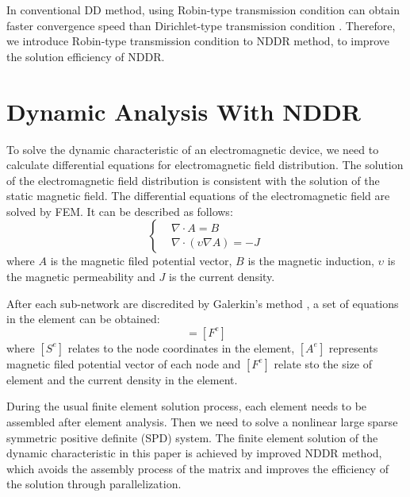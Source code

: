 \documentclass[journal,transmag]{IEEEtran}
\begin{document}
In conventional DD method, using Robin-type transmission condition  can obtain faster convergence speed than Dirichlet-type transmission condition \cite{IEEEhowto:Douglas}. Therefore, we introduce Robin-type transmission condition to NDDR method, to improve the solution efficiency of NDDR.
\section{Dynamic Analysis With NDDR}
To solve the dynamic characteristic of an electromagnetic device, we need to calculate differential equations for electromagnetic field distribution. The solution of the electromagnetic field distribution is consistent with the solution of the static magnetic field. The differential equations of the electromagnetic field are solved by FEM. It can be described as follows:
\begin{equation}
\left\{
\begin{aligned}
&{\nabla\cdot}A=B\\
&\nabla\cdot({\upsilon\nabla}A)=-J
\end{aligned}
\right.
\end{equation}
where $A$ is the magnetic filed potential vector, $B$ is the magnetic induction, $\upsilon$ is the magnetic permeability and $J$ is the current density. 

After each sub-network are discredited by Galerkin's method \cite{IEEEhowto:Rao}, a set of equations in the element can be obtained:
\begin{equation}
[S^e][A^e]=[F^e]
\end{equation}
where $[S^e]$ relates to the node coordinates in the element, $[A^e]$ represents magnetic filed potential vector of each node and $[F^e]$ relate sto the size of element and the current density in the element.

During the usual finite element solution process, each element needs to be assembled after element analysis. Then we need to solve a nonlinear large sparse symmetric positive definite (SPD) system. The finite element solution of the dynamic characteristic in this paper is achieved by improved NDDR method, which avoids the assembly process of the matrix and improves the efficiency of the solution through parallelization.
\end{document}
